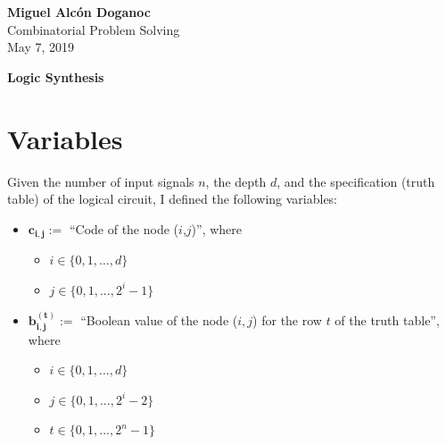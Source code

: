 \documentclass[letterpaper,10pt]{article}
\begin{document}
\noindent
\begin{flushright}
    \large\textbf{Miguel Alcón Doganoc} \\
    Combinatorial Problem Solving \\
    May 7, 2019
\end{flushright}

\noindent
{\huge{\textbf{Logic Synthesis}}}

\section{Variables}
Given the number of input signals $n$, the depth $d$, and the specification (truth table) of the logical circuit, I defined the following variables:
\begin{itemize}
    \item $\mathbf{c_{i,j}}:=$ ``Code of the node ($i$,$j$)'', where
    \begin{itemize}
        \item $i \in \{0,1,...,d\}$
        \item $j \in \{0,1,...,2^i-1\}$
    \end{itemize}
    \item $\mathbf{b_{i,j}^{(t)}}:=$ ``Boolean value of the node ($i,j$) for the row $t$ of the truth table'', where
    \begin{itemize}
        \item $i \in \{0,1,...,d\}$
        \item $j \in \{0,1,...,2^i-2\}$
        \item $t \in \{0,1,...,2^n-1\}$
    \end{itemize}
\end{itemize}
\end{document}
